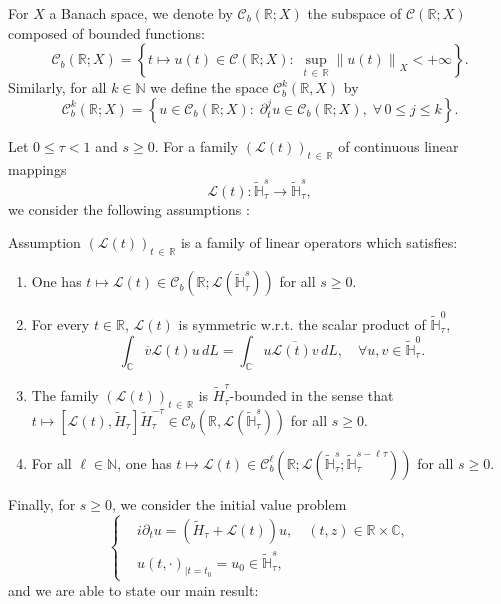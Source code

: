 \documentclass[AHL,Unicode,published]{cedram}
\newcommand{\C}{\mathbb{C}}
\newcommand{\R}{\mathbb{R}}
\newcommand{\HH}{\mathbb{H}}
\newcommand{\N}{\mathbb{N}}
\newcommand{\clL}{\mathcal{L}}
\newcommand{\clC}{\mathcal{C}}
\renewcommand{\L}{\mathscr{L}}
\newcommand{\ov}{\overline}
\newcommand{\wt}{\widetilde}
\newcommand{\<}{\langle}
\renewcommand{\>}{\rangle}
\newcommand*{\romanenumi}{\renewcommand*{\theenumi}{\roman{enumi}}}
\let\oldforall\forall
\renewcommand*{\forall}{\mathrel{\oldforall}}
\newcommand{\R}{\mathbb{R}}
\begin{document}
For $X$ a Banach space, we denote by $\clC_b(\R;X)$ the subspace of $\clC(\R;X)$ composed of bounded functions:
\[
\clC_b\left(\R ; X\right)= \left\{t\mapsto u(t) \in \clC\left(\R;X\right) :\; \sup_{t\,\in\,\R} \left\|u(t)\right\|_X <+\infty \right\}.
\]
Similarly, for all $k \in \N$ we define the space $\clC^k_b(\R,X)$ by
\[
\clC^k_b\left(\R;X\right)= \left\{ u \in \clC_b\left(\R;X\right) :\; \partial^j_t u \in \clC_b\left(\R;X\right),\; \forall \,0 \leq j \leq k \right\}.
\]

Let $0 \leq\tau <1$ and $s\geq 0$. For a family $(\L(t))_{t\,\in\,\R}$ of continuous linear mappings
\[
\L(t) : \widetilde{\HH}^{s}_\tau\longrightarrow\widetilde{\HH}_\tau^{s},
\]
we consider the following assumptions :

\begin{enonce}{Assumption}\label{assumption1}
$(\L(t))_{t\,\in\,\R}$ is a family of linear operators which satisfies:
\begin{enumerate}\romanenumi
\item\label{assump1.1.1} One has $t\longmapsto \L(t) \in \clC_b(\R; \clL(\widetilde{\HH}_\tau^{s}))$ for all $s \geq 0$.
\item\label{assump1.1.2} For every $t\in \R$, $\L(t)$ is symmetric w.r.t. the scalar product of $\widetilde{\HH}_\tau^{0}$,
\[
\int_{\C} \ov{v} \L(t) u \,dL= \int_{\C} u\ov{ \L(t) v }\,dL, \quad \forall{u,v \in \widetilde{\HH}_\tau^{0}}.
\]
\item\label{assump1.1.3} The family $(\L(t))_{t\,\in\,\R}$ is $\wt{H}_\tau^{\tau}$-bounded in the sense that $t\longmapsto [\L(t), \wt{H}_\tau] \wt{H}_\tau^{-\tau} \in \clC_b(\R,\clL(\widetilde{\HH}_\tau^{s}))$ for all $s
\geq 0$.
\item\label{assump1.1.4} For all $\ell \in \N$, one has $t\longmapsto \L(t) \in \clC^{\ell}_b(\R; \clL(\widetilde{\HH}_\tau^{s} ; \widetilde{\HH}_\tau^{s- \ell \tau}))$ for all $s \geq 0$.
\end{enumerate}
\end{enonce}

Finally, for $s\geq 0$, we consider the initial value problem
\begin{equation}\label{lin-abs}
\left\{
\begin{aligned}
&i\partial_t u=\left(\wt{H}_\tau+\L(t) \right)u, \quad (t,z)\in \R\times \C,\\
&u(t, \cdot)_{|t=t_0}= u_0 \in \widetilde{\HH}_\tau^{s},
\end{aligned}
\right.
\end{equation}
and we are able to state our main result:
\end{document}
